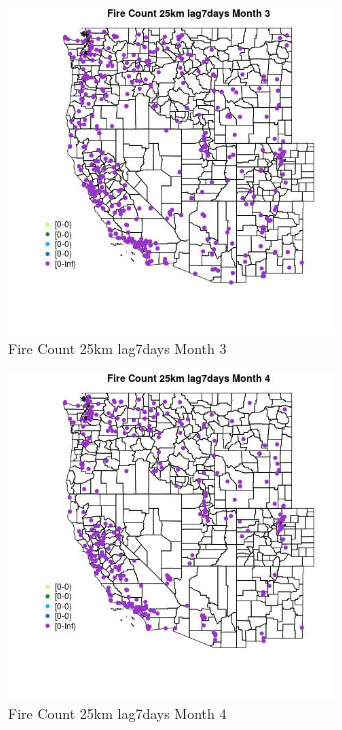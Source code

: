 \begin{figure} 
\centering  
\includegraphics[width=0.77\textwidth]{Code_Outputs/Report_ML_input_PM25_Step4_part_e_de_duplicated_aves_compiled_2019-05-18wNAs_MapObsMo3Fire_Count_25km_lag7days.jpg} 
\caption{\label{fig:Report_ML_input_PM25_Step4_part_e_de_duplicated_aves_compiled_2019-05-18wNAsMapObsMo3Fire_Count_25km_lag7days}Fire Count 25km lag7days Month 3} 
\end{figure} 
 

\begin{figure} 
\centering  
\includegraphics[width=0.77\textwidth]{Code_Outputs/Report_ML_input_PM25_Step4_part_e_de_duplicated_aves_compiled_2019-05-18wNAs_MapObsMo4Fire_Count_25km_lag7days.jpg} 
\caption{\label{fig:Report_ML_input_PM25_Step4_part_e_de_duplicated_aves_compiled_2019-05-18wNAsMapObsMo4Fire_Count_25km_lag7days}Fire Count 25km lag7days Month 4} 
\end{figure} 
 

